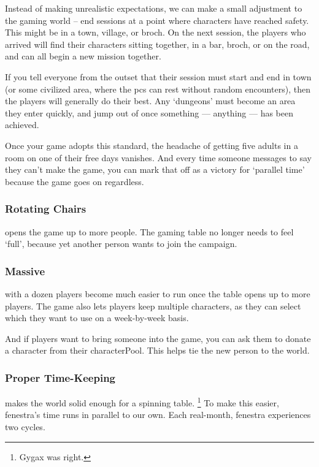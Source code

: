 \begin{multicols}{2}
Instead of making unrealistic expectations, we can make a small adjustment to the gaming world -- end sessions at a point where characters have reached safety.
This might be in a town, \gls{village}, or \gls{broch}.
On the next session, the players who arrived will find their characters sitting together, in a bar, \gls{broch}, or on the road, and can all begin a new mission together.

If you tell everyone from the outset that their session must start and end in town (or some civilized area, where the \glspl{pc} can rest without random encounters), then the players will generally do their best.
Any `dungeons' must become an area they enter quickly, and jump out of once something --- anything --- has been achieved.

Once your game adopts this standard, the headache of getting five adults in a room on one of their free days vanishes.
And every time someone messages to say they can't make the game, you can mark that off as a victory for `parallel time' because the game goes on regardless.

\subsubsection{Rotating Chairs}
opens the game up to more people.
The gaming table no longer needs to feel `full', because yet another person wants to join the \gls{campaign}.

\subsubsection{Massive }
with a dozen players become much easier to run once the table opens up to more players.
The game also lets players keep multiple characters, as they can select which they want to use on a week-by-week basis.

And if players want to bring someone into the game, you can ask them to donate a character from their \gls{characterPool}.
This helps tie the new person to the world.

\subsubsection{Proper Time-Keeping}
makes the world solid enough for a spinning table.%
\footnote{Gygax was right.}
To make this easier, \gls{fenestra}'s time runs in parallel to our own.
Each real-month, \gls{fenestra} experiences two \glspl{cycle}.


\end{multicols}
